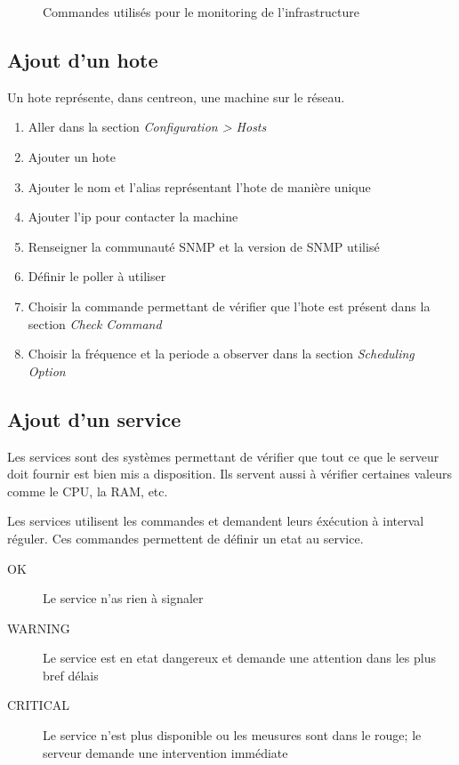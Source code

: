 \begin{figure}
\begin{tabulary}{\textwidth}{|C|L|}
			\end{tabulary}
			\caption{Commandes utilisés pour le monitoring de l'infrastructure}
		\end{figure}

		\clearpage

		\subsection{Ajout d'un hote}

		Un hote représente, dans centreon, une machine sur le réseau.

		\begin{enumerate}
			\item Aller dans la section \emph{Configuration > Hosts}
			\item Ajouter un hote
			\item Ajouter le nom et l'alias représentant l'hote de manière unique
			\item Ajouter l'ip pour contacter la machine
			\item Renseigner la communauté SNMP et la version de SNMP utilisé
			\item Définir le poller à utiliser
			\item Choisir la commande permettant de vérifier que l'hote est présent dans la section \emph{Check Command}
			\item Choisir la fréquence et la periode a observer dans la section \emph{Scheduling Option}
		\end{enumerate}

		\subsection{Ajout d'un service}

		Les services sont des systèmes permettant de vérifier que tout ce que le serveur doit fournir est bien mis a disposition.
		Ils servent aussi à vérifier certaines valeurs comme le CPU, la RAM, etc.

		Les services utilisent les commandes et demandent leurs éxécution à interval réguler.
		Ces commandes permettent de définir un etat au service.

		\begin{description}
			\item[OK] Le service n'as rien à signaler
			\item[WARNING] Le service est en etat dangereux et demande une attention dans les plus bref délais
			\item[CRITICAL] Le service n'est plus disponible ou les meusures sont dans le rouge; le serveur demande une intervention immédiate
		\end{description}

